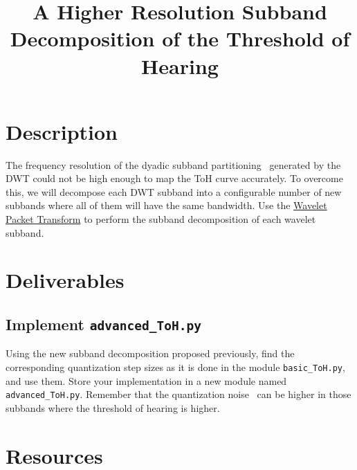 
\title{A Higher Resolution Subband Decomposition of the Threshold of Hearing}

\maketitle

\section{Description}

The frequency resolution of the dyadic subband
partitioning~\cite{vetterli1995wavelets} generated by the DWT could not
be high enough to map the ToH curve accurately. To overcome this, we
will decompose each DWT subband into a configurable number of new
subbands where all of them will have the same bandwidth. Use the
\href{https://pywavelets.readthedocs.io/en/latest/ref/2d-decompositions-overview.html#wavelet-packet-transform}{Wavelet
  Packet Transform} to perform the subband decomposition of each
wavelet subband.

\section{Deliverables}

\subsection{Implement \texttt{advanced\_ToH.py}}

Using the new subband decomposition proposed previously, find the
corresponding quantization step sizes as it is done in the module
\verb|basic_ToH.py|, and use them. Store your implementation in a new
module named \verb|advanced_ToH.py|. Remember that the quantization
noise~\cite{sayood2017introduction} can be higher in those subbands
where the threshold of hearing is higher.

\begin{comment}
\subsection{Subjective performance}

\begin{enumerate}
\item Using a recording tool such as
  \href{http://audacity.sourceforge.net}{Audacity} or
  \href{http://plugin.org.uk/timemachine/}{JACK Timemachine}, record
  the simulated transmission of a piece of audio and create a
  \texttt{.wav} file, when the audio has been transmitted using
  \texttt{temporal\_overlapped\_DWT\_coding.py} and
  \texttt{threshold.py}, using in both cases the same transmission
  bit-rate. Vary the quantization step size for controlling the
  bit-rate.
\item Determine which audio sounds better from a subjective point of
  view. Repeat this step the number of times you consider necessary.
\end{enumerate}
\end{comment}

\section{Resources}



